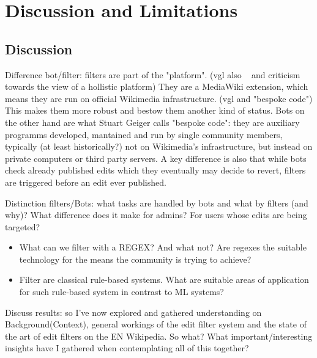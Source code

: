 \chapter{Discussion and Limitations}
\label{chap:discussion}

\section{Discussion}

Difference bot/filter: filters are part of the "platform". (vgl also ~\cite{Geiger2014} and criticism towards the view of a hollistic platform)
They are a MediaWiki extension, which means they are run on official Wikimedia infrastructure. (vgl \cite{Geiger2014} and "bespoke code")
This makes them more robust and bestow them another kind of status.
Bots on the other hand are what Stuart Geiger calls "bespoke code": they are auxiliary programms developed, mantained and run by single community members, typically (at least historically?) not on Wikimedia's infrastructure, but instead on private computers or third party servers.
A key difference is also that while bots check already published edits which they eventually may decide to revert, filters are triggered before an edit ever published.

Distinction filters/Bots: what tasks are handled by bots and what by filters (and why)? What difference does it make for admins? For users whose edits are being targeted? %

\begin{itemize}
    \item What can we filter with a REGEX? And what not? Are regexes the suitable technology for the means the community is trying to achieve?
    \item Filter are classical rule-based systems. What are suitable areas of application for such rule-based system in contrast to ML systems?
\end{itemize}

Discuss results:
so I've now explored and gathered understanding on Background(Context), general workings of the edit filter system and the state of the art of edit filters on the EN Wikipedia.
So what? What important/interesting insights have I gathered when contemplating all of this together?

